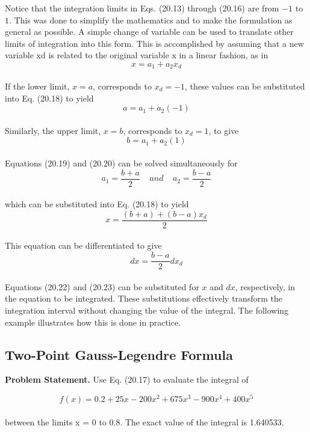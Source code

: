 \documentclass[../main.tex]{subfiles}
\begin{document}
Notice that the integration limits in Eqs. (20.13) through (20.16) are from $-1$ to $1$. This
was done to simplify the mathematics and to make the formulation as general as possible.
A simple change of variable can be used to translate other limits of integration into this
form. This is accomplished by assuming that a new variable xd is related to the original
variable x in a linear fashion, as in
\begin{equation}
	\tag{20.18}
	x = a_1 + a_2x_d
\end{equation}\\
If the lower limit, $x = a$, corresponds to $x_d = −1$, these values can be substituted into
Eq. (20.18) to yield
\begin{equation}
	\tag{20.19}
	a=a_1 + a_2(-1)
\end{equation}\\
Similarly, the upper limit, $x = b$, corresponds to $x_d = 1$, to give
\begin{equation}
	\tag{20.20}
	b=a_1 + a_2(1)
\end{equation}\\
Equations (20.19) and (20.20) can be solved simultaneously for
\begin{equation}
	\tag{20.21}
	a_1=\dfrac{b+a}{2}\; \; \; \; and \; \; \; \;
	a_2=\dfrac{b-a}{2}
\end{equation}\\
which can be substituted into Eq. (20.18) to yield
\begin{equation}
	\tag{20.22}
	x = \dfrac{(b+a)+(b-a)x_d}{2}
\end{equation}\\
This equation can be differentiated to give
\begin{equation}
	\tag{20.23}
	dx = \dfrac{b-a}{2} dx_d
\end{equation}\\
Equations (20.22) and (20.23) can be substituted for $x$ and $dx$, respectively, in the equation
to be integrated. These substitutions effectively transform the integration interval without
changing the value of the integral. The following example illustrates how this is done in
practice.


\subsection{Two-Point Gauss-Legendre Formula}
\textbf{Problem Statement.} Use Eq. (20.17) to evaluate the integral of

	$$f(x)=0.2+25x-200x^2 + 675x^3 - 900x^4 +400x^5$$\\
between the limits x = 0 to 0.8. The exact value of the integral is 1.640533.
\end{document}
